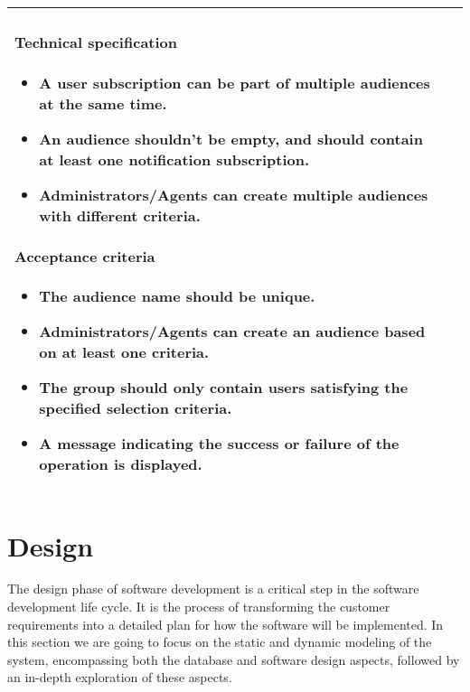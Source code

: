 \begin{longtable}{ | m{} | m{} | }
    \paragraph*{Technical specification} \mbox{} \newline
    \begin{itemize}
        \item A user subscription can be part of multiple audiences at the same time.
        \item An audience shouldn't be empty, and should contain at least one notification subscription.
        \item Administrators/Agents can create multiple audiences with different criteria.
    \end{itemize}
    \paragraph*{Acceptance criteria} \mbox{} \newline
    \begin{itemize}
        \item The audience name should be unique.
        \item Administrators/Agents can create an audience based on at least one criteria.
        \item The group should only contain users satisfying the specified selection criteria.
        \item A message indicating the success or failure of the operation is displayed.
    \end{itemize}                                                                                                                                                                                 \\
    \hline
\end{longtable}

\section{Design}
The design phase of software development is a critical step in the software development life cycle.
It is the process of transforming the customer requirements into a detailed plan for how the software
will be implemented. In this section we are going to focus on the static and dynamic modeling of the system,
encompassing both the database and software design aspects, followed by an in-depth exploration of
these aspects.

